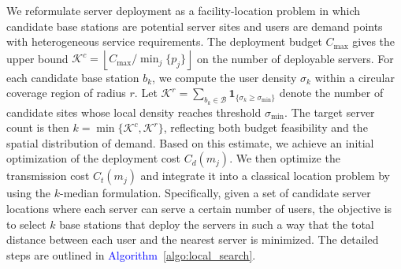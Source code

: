 \documentclass[10pt, conference, letterpaper]{IEEEtran}
\newenvironment{revision}{\begingroup\color{blue}}{\endgroup}
\newcommand{\rev}[1]{\textcolor{blue}{#1}}
\newenvironment{revision}{\begingroup}{\endgroup}
\newcommand{\rev}[1]{#1}
\begin{document}
\begin{revision}
We reformulate server deployment as a facility-location problem in which candidate base stations are potential server sites and users are demand points with heterogeneous service requirements. The deployment budget $C_{\max}$ gives the upper bound $\mathcal{K}^c=\left\lfloor C_{\max}/\min_j\{p_j\}\right\rfloor$ on the number of deployable servers. For each candidate base station $b_k$, we compute the user density $\sigma_k$ within a circular coverage region of radius $r$. Let $\mathcal{K}^r=\sum_{b_k\in\mathcal{B}}\mathbf{1}_{\{\sigma_k\geq\sigma_{\min}\}}$ denote the number of candidate sites whose local density reaches threshold $\sigma_{\min}$. The target server count is then $k=\min\{\mathcal{K}^c,\mathcal{K}^r\}$, reflecting both budget feasibility and the spatial distribution of demand.
\end{revision}
Based on this estimate, we achieve an initial optimization of the deployment cost $C_d(m_j)$. We then optimize the transmission cost $C_t(m_j)$ and integrate it into a classical location problem by using the $k$-median formulation. Specifically, given a set of candidate server locations where each server can serve a certain number of users, the objective is to select $k$ base stations that deploy the servers in such a way that the total distance between each user and the nearest server is minimized. The detailed steps are outlined in \rev{Algorithm~\ref{algo:local_search}}.
\end{document}
